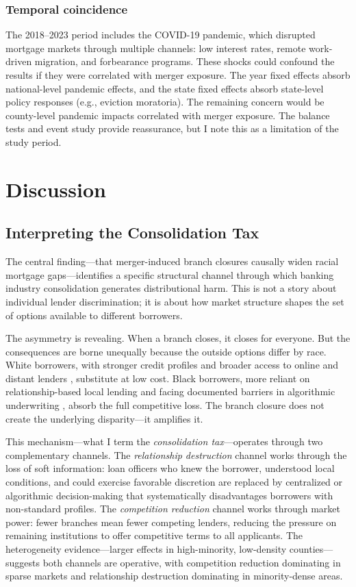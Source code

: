 \documentclass[12pt]{article}
\begin{document}
\subsubsection*{Temporal coincidence} The 2018--2023 period includes the COVID-19 pandemic, which disrupted mortgage markets through multiple channels: low interest rates, remote work-driven migration, and forbearance programs. These shocks could confound the results if they were correlated with merger exposure. The year fixed effects absorb national-level pandemic effects, and the state fixed effects absorb state-level policy responses (e.g., eviction moratoria). The remaining concern would be county-level pandemic impacts correlated with merger exposure. The balance tests and event study provide reassurance, but I note this as a limitation of the study period.


\section{Discussion}
\label{sec:discussion}

\subsection{Interpreting the Consolidation Tax}

The central finding---that merger-induced branch closures causally widen racial mortgage gaps---identifies a specific structural channel through which banking industry consolidation generates distributional harm. This is not a story about individual lender discrimination; it is about how market structure shapes the set of options available to different borrowers.

The asymmetry is revealing. When a branch closes, it closes for everyone. But the consequences are borne unequally because the outside options differ by race. White borrowers, with stronger credit profiles and broader access to online and distant lenders \citep{bartlett2022}, substitute at low cost. Black borrowers, more reliant on relationship-based local lending and facing documented barriers in algorithmic underwriting \citep{bartlett2022, bhutta2020}, absorb the full competitive loss. The branch closure does not create the underlying disparity---it amplifies it.

This mechanism---what I term the \emph{consolidation tax}---operates through two complementary channels. The \emph{relationship destruction} channel works through the loss of soft information: loan officers who knew the borrower, understood local conditions, and could exercise favorable discretion are replaced by centralized or algorithmic decision-making that systematically disadvantages borrowers with non-standard profiles. The \emph{competition reduction} channel works through market power: fewer branches mean fewer competing lenders, reducing the pressure on remaining institutions to offer competitive terms to all applicants. The heterogeneity evidence---larger effects in high-minority, low-density counties---suggests both channels are operative, with competition reduction dominating in sparse markets and relationship destruction dominating in minority-dense areas.
\end{document}
